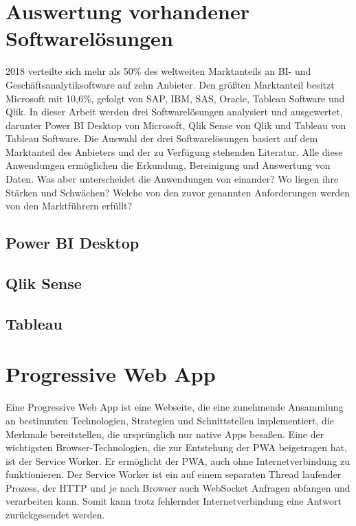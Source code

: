 \section{Auswertung vorhandener Softwarelösungen}
\label{sec:auswertungvorhandenersoftwareloesungen}
2018 verteilte sich mehr als 50\% des weltweiten Marktanteils an BI- und Geschäftsanalytiksoftware auf
zehn Anbieter. Den größten Marktanteil besitzt Microsoft mit 10,6\%, gefolgt von SAP, IBM, SAS, Oracle,
Tableau Software und Qlik.\cite{StatistaMarketshareBI}
In dieser Arbeit werden drei Softwarelösungen analysiert und ausgewertet, darunter Power BI Desktop von
Microsoft, Qlik Sense von Qlik und Tableau von Tableau Software. Die Auswahl der drei Softwarelösungen
basiert auf dem Marktanteil des Anbieters und der zu Verfügung stehenden Literatur. Alle diese 
Anwendungen ermöglichen die Erkundung, Bereinigung und Auswertung von Daten. Was aber unterscheidet
die Anwendungen von einander? Wo liegen ihre Stärken und Schwächen? Welche von den zuvor genannten
Anforderungen werden von den Marktführern erfüllt?

\subsection{Power BI Desktop}
\label{subsec:powerbidesktop}


\subsection{Qlik Sense}
\label{subsec:qliksense}

\subsection{Tableau}
\label{subsec:tableau}

\section{Progressive Web App}
\label{sec:progressivewebapp}
Eine Progressive Web App ist eine Webseite, die eine zunehmende Ansammlung an bestimmten Technologien,
Strategien und Schnittstellen implementiert, die Merkmale bereitstellen, die ursprünglich nur
native Apps besaßen.\cite{WikiPWA} Eine der wichtigsten Browser-Technologien, die zur Entstehung der PWA beigetragen hat,
ist der Service Worker. Er ermöglicht der PWA, auch ohne Internetverbindung zu funktionieren. Der 
Service Worker ist ein auf einem separaten Thread laufender Prozess, der HTTP und je nach Browser
auch WebSocket Anfragen abfangen und verarbeiten kann. Somit kann trotz fehlernder Internetverbindung
eine Antwort zurückgesendet werden. \cite{W3ServiceWorker}


